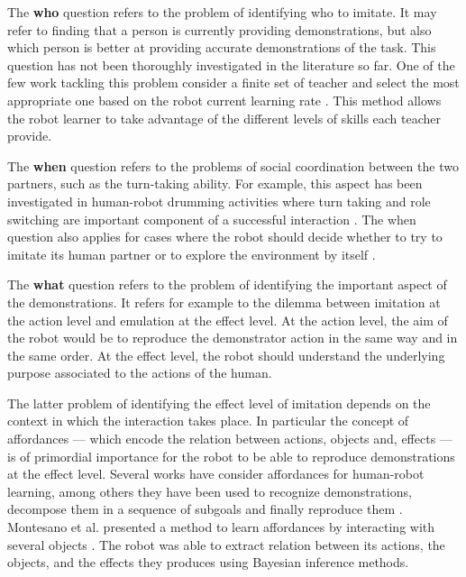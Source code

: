 The \textbf{who} question refers to the problem of identifying who to imitate. It may refer to finding that a person is currently providing demonstrations, but also which person is better at providing accurate demonstrations of the task. This question has not been thoroughly investigated in the literature so far. One of the few work tackling this problem consider a finite set of teacher and select the most appropriate one based on the robot current learning rate \cite{Nguyen2012PJBR}. This method allows the robot learner to take advantage of the different levels of skills each teacher provide.

The \textbf{when} question refers to the problems of social coordination between the two partners, such as the turn-taking ability. For example, this aspect has been investigated in human-robot drumming activities where turn taking and role switching are important component of a successful interaction \cite{weinberg2006robot,kose2008emergent}. The when question also applies for cases where the robot should decide whether to try to imitate its human partner or to explore the environment by itself \cite{chernova09jair,Nguyen2012PJBR}. 

The \textbf{what} question refers to the problem of identifying the important aspect of the demonstrations. It refers for example to the dilemma between imitation at the action level and emulation at the effect level. At the action level, the aim of the robot would be to reproduce the demonstrator action in the same way and in the same order. At the effect level, the robot should understand the underlying purpose associated to the actions of the human.

The latter problem of identifying the effect level of imitation depends on the context in which the interaction takes place. In particular the concept of affordances \cite{gibson1986ecological} --- which encode the relation between actions, objects and, effects --- is of primordial importance for the robot to be able to reproduce demonstrations at the effect level. Several works have consider affordances for human-robot learning, among others they have been used to recognize demonstrations, decompose them in a sequence of subgoals and finally reproduce them \cite{macl07affimit}. Montesano et al. presented a method to learn affordances by interacting with several objects \cite{montesano2008learning}. The robot was able to extract relation between its actions, the objects, and the effects they produces using Bayesian inference methods.

